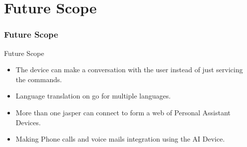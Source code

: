 \documentclass[xcolor=dvipsnames]{beamer}
\begin{document}
\section{Future Scope}
\begin{frame}
\frametitle{Future Scope}
\begin{alertblock}{Future Scope}
\begin{itemize}
\item The device can make a conversation with the user instead of just servicing the commands.
\item Language translation on go for multiple languages.
\item More than one jasper can connect to form a web of Personal Assistant Devices.
\item Making Phone calls and voice mails integration using the AI Device. 
\end{itemize}
\end{alertblock}
\end{frame}
\end{document}
